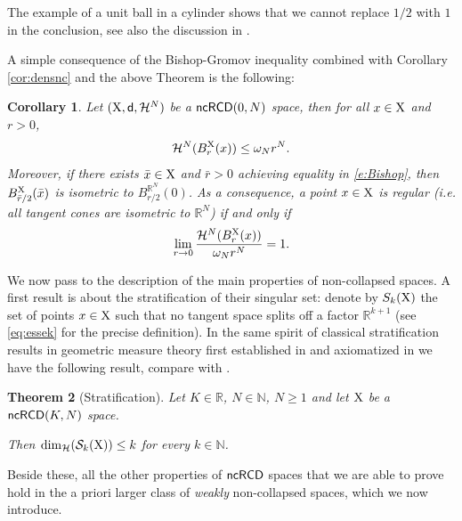 \documentclass[reqno,11pt]{article}
\numberwithin{equation}{section}
\newcommand{\N}{\mathbb{N}}
\newcommand{\R}{\mathbb{R}}
\newcommand{\sfd}{{\sf d}}
\newtheorem{theorem}{Theorem}[section]
\newtheorem{corollary}[theorem]{Corollary}
\newcommand{\X}{{\rm X}}
\newcommand{\ncRCD}{{\sf ncRCD}}
\newcommand{\HH}{{\mathcal H}}
\begin{document}
The example  of a unit ball in a cylinder shows that we cannot replace $1/2$ with $1$ in the conclusion, see also the discussion in \cite{DPG16}. { A simple consequence of the Bishop-Gromov inequality combined  with Corollary \ref{cor:densnc}  and  the above Theorem is the following:

\begin{corollary}\label{cor:Bishop}
Let $(\X,\sfd,\HH^N)$ be a $\ncRCD(0,N)$ space, then for all \(x\in \X\) and \(r>0\), 
\begin{equation}\label{e:Bishop}
\HH^N(B_{r}^\X(x))\le \omega_Nr^N.
\end{equation}
Moreover, if there exists \(\bar x\in \X\) and \(\bar r>0\) achieving equality in \eqref{e:Bishop}, then \(B_{\bar r/2}^\X(\bar x)\) is isometric to \(B_{r/2}^{\R^N}(0)\). As a consequence, a point \(x\in \X\) is regular (i.e. all tangent cones are isometric to \(\R^N\)) if and only if 
\[
\lim_{r\to 0} \frac{\HH^N(B_{r}^\X(x))}{\omega_N r^N}=1.
\]
\end{corollary}
}

We now pass to the description of the main properties of non-collapsed spaces. A first result is about the stratification of their singular set: denote by $S_k(\X)$ the set of points $x\in\X$ such that no tangent space splits off a factor $\R^{k+1}$ (see \eqref{eq:essek} for the precise definition). In the same spirit of classical stratification results in geometric measure theory first established in \cite{Almgren00} and axiomatized in \cite{White97} we have the following result, compare with  \cite[Theorem 4.7]{Cheeger-Colding97I}.
\begin{theorem}[Stratification]\label{thm:singular}
Let $K\in\R$, {$N\in\N $}, $N\geq 1$ and let $\X$ be a  $\ncRCD(K,N)$ space.
 
Then \(\dim_\HH(\mathcal S_k(\X))\leq k\)  for every $k\in\N$.
 \end{theorem}
Beside these, all the other properties of $\ncRCD$ spaces that we are able to prove hold in the a priori larger class of \emph{weakly} non-collapsed spaces, which we now introduce.

\bigskip
\end{document}

